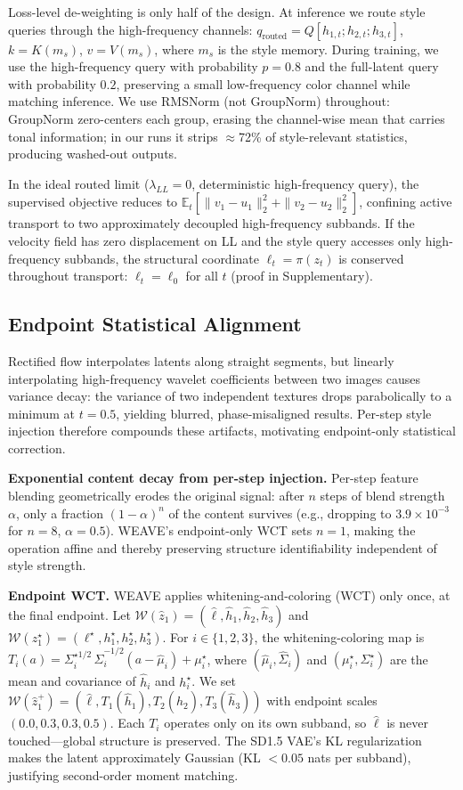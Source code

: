 \documentclass[letterpaper]{article}
\begin{document}
Loss-level de-weighting is only half of the design.
At inference we route style queries through the high-frequency channels: $q_{\mathrm{routed}} = Q[h_{1,t};h_{2,t};h_{3,t}]$, $k = K(m_s)$, $v = V(m_s)$, where $m_s$ is the style memory.
During training, we use the high-frequency query with probability $p=0.8$ and the full-latent query with probability $0.2$, preserving a small low-frequency color channel while matching inference.
We use RMSNorm (not GroupNorm) throughout: GroupNorm zero-centers each group, erasing the channel-wise mean that carries tonal information; in our runs it strips $\approx$72\% of style-relevant statistics, producing washed-out outputs.

In the ideal routed limit ($\lambda_{LL}=0$, deterministic high-frequency query), the supervised objective reduces to $\mathbb E_t[\|v_1-u_1\|_2^2 + \|v_2-u_2\|_2^2]$, confining active transport to two approximately decoupled high-frequency subbands.
If the velocity field has zero displacement on LL and the style query accesses only high-frequency subbands, the structural coordinate $\ell_t = \pi(z_t)$ is conserved throughout transport: $\ell_t = \ell_0$ for all $t$ (proof in Supplementary).

\subsection{Endpoint Statistical Alignment}
\label{sec:eota}

Rectified flow interpolates latents along straight segments, but linearly interpolating high-frequency wavelet coefficients between two images causes variance decay: the variance of two independent textures drops parabolically to a minimum at $t=0.5$, yielding blurred, phase-misaligned results.
Per-step style injection therefore compounds these artifacts, motivating endpoint-only statistical correction.

\textbf{Exponential content decay from per-step injection.}
Per-step feature blending geometrically erodes the original signal: after $n$ steps of blend strength $\alpha$, only a fraction $(1-\alpha)^n$ of the content survives (e.g., dropping to $3.9\times10^{-3}$ for $n=8$, $\alpha=0.5$).
WEAVE's endpoint-only WCT sets $n=1$, making the operation affine and thereby preserving structure identifiability independent of style strength.

\textbf{Endpoint WCT.}
WEAVE applies whitening-and-coloring (WCT) only once, at the final endpoint.
Let $\mathcal W(\hat z_1) = (\hat \ell,\hat h_1,\hat h_2,\hat h_3)$ and $\mathcal W(z_1^\star) = (\ell^\star,h_1^\star,h_2^\star,h_3^\star)$.
For $i\in\{1,2,3\}$, the whitening-coloring map is $T_i(a) = \Sigma_i^{\star 1/2}\,\hat\Sigma_i^{-1/2}(a-\hat\mu_i)+\mu_i^\star$,
where $(\hat\mu_i,\hat\Sigma_i)$ and $(\mu_i^\star,\Sigma_i^\star)$ are the mean and covariance of $\hat h_i$ and $h_i^\star$.
We set $\mathcal W(\hat z_1^+) = (\hat \ell, T_1(\hat h_1), T_2(\hat h_2), T_3(\hat h_3))$ with endpoint scales $(0.0, 0.3, 0.3, 0.5)$.
Each $T_i$ operates only on its own subband, so $\hat \ell$ is never touched---global structure is preserved.
The SD1.5 VAE's KL regularization makes the latent approximately Gaussian (KL $<0.05$ nats per subband), justifying second-order moment matching.
\end{document}
